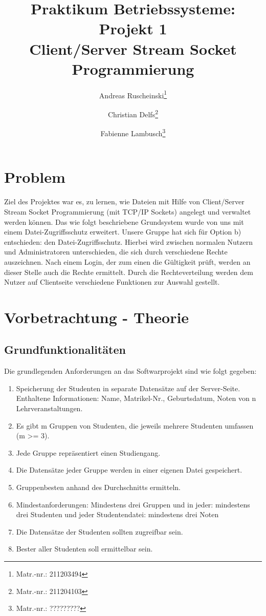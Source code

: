 \documentclass{scrartcl}
\title{Praktikum Betriebssysteme: Projekt 1\\ Client/Server Stream Socket Programmierung}
\author{Andreas Ruscheinski\thanks{Matr.-nr.: 211203494}\and Christian Delfs\thanks{Matr.-nr.: 211204103}\and Fabienne Lambusch\thanks{Matr.-nr.: ?????????}}
\begin{document}
\maketitle
\tableofcontents

\section{Problem}
	Ziel des Projektes war es, zu lernen, wie Dateien mit Hilfe von Client/Server Stream Socket Programmierung (mit TCP/IP Sockets) angelegt und verwaltet werden können. Das wie folgt beschriebene Grundsystem wurde von uns mit einem Datei-Zugriffsschutz erweitert. 
	Unsere Gruppe hat sich für Option b) entschieden: den Datei-Zugriffsschutz. Hierbei wird zwischen normalen Nutzern und Administratoren unterschieden, die sich durch verschiedene Rechte auszeichnen. Nach einem Login, der zum einen die Gültigkeit prüft, werden an dieser Stelle auch die Rechte ermittelt. Durch die Rechteverteilung werden dem Nutzer auf Clientseite verschiedene Funktionen zur Auswahl gestellt.\\

\section{Vorbetrachtung - Theorie}
	\subsection{Grundfunktionalitäten}
		Die grundlegenden Anforderungen an das Softwarprojekt sind wie folgt gegeben:
		\begin{enumerate}
		\item Speicherung der Studenten in separate Datensätze auf der Server-Seite. Enthaltene Informationen: Name, Matrikel-Nr., Geburtsdatum, Noten von n
		Lehrveranstaltungen.
		\item Es gibt m Gruppen von Studenten, die jeweils mehrere Studenten umfassen (m >= 3).
		\item Jede Gruppe repräsentiert einen Studiengang.
		\item Die Datensätze jeder Gruppe werden in einer eigenen Datei gespeichert.
		\item Gruppenbesten anhand des Durchschnitts ermitteln.
		\item Mindestanforderungen: Mindestens drei Gruppen und in jeder: mindestens drei Studenten und jeder Studentendatei: mindestens drei Noten
		\item Die Datensätze der Studenten sollten zugreifbar sein.
		\item Bester aller Studenten soll ermittelbar sein.
		
		\end{enumerate}
\end{document}
